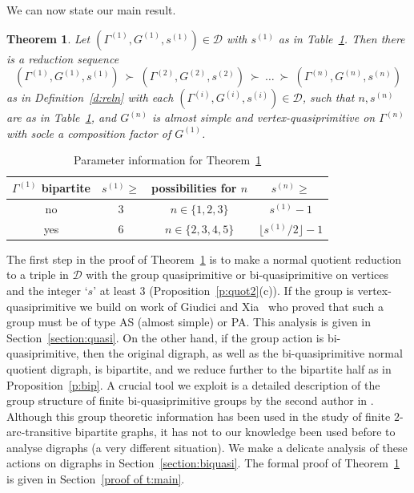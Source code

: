 \documentclass[11pt]{amsart}
\newtheorem{theorem}{Theorem}[section]
\newcommand\DD{{\mathscr{D}}}
\begin{document}
We can now state our main result.


\begin{theorem}\label{t:main}
Let $(\Gamma^{(1)},G^{(1)},s^{(1)})\in\DD$ with $s^{(1)}$ as in Table~\ref{tab:main}. Then there is a reduction sequence 
\[
(\Gamma^{(1)},G^{(1)},s^{(1)}) \ \succ\   (\Gamma^{(2)},G^{(2)},s^{(2)}) \ \succ\  \dots  \ \succ\  (\Gamma^{(n)},G^{(n)},s^{(n)})
\]
as in Definition~\ref{d:reln} with each $(\Gamma^{(i)},G^{(i)},s^{(i)})\in\DD$, such that $n, s^{(n)}$ are as in Table~\ref{tab:main}, and  $G^{(n)}$ is almost simple and vertex-quasiprimitive on $\Gamma^{(n)}$ with socle a composition factor of $G^{(1)}$. 
\end{theorem}

\begin{table}[]
    \centering
    \begin{tabular}{cccc}
    \hline
    $\Gamma^{(1)}$ bipartite  &$s^{(1)}\geqslant$  & possibilities for \(n\) &\(s^{(n)}\geqslant\) \\
       \hline
    no  & 3 & $n\in\{ 1, 2, 3\}$ & $s^{(1)}-1$ \\
    yes & 6 & $n\in\{2, 3,4,5\}$ & $\lfloor s^{(1)}/2\rfloor -1$ \\
    \hline
      \end{tabular}
    \caption{Parameter information for Theorem~\ref{t:main}}
    \label{tab:main}
\end{table}


The first step in the proof of Theorem~\ref{t:main} is to make a normal quotient reduction to a triple in $\DD$ with the group  quasiprimitive or bi-quasiprimitive on vertices and the integer `$s$' at least $3$ (Proposition~\ref{p:quot2}(c)). 
If the group is vertex-quasiprimitive we build on work of  Giudici and Xia~\cite{quasi} who proved that such a group must be  of type AS (almost simple) or PA. This analysis is given in Section~\ref{section:quasi}. 
On the other hand, if the group action is bi-quasiprimitive, then the original digraph, as well as the bi-quasiprimitive normal quotient digraph, is bipartite, and we reduce further to the bipartite half as in Proposition~\ref{p:bip}. A crucial tool we exploit is a detailed description of the group structure of finite bi-quasiprimitive groups by the second author in \cite{Praeger03}. Although this group theoretic information has been used in the study of finite \(2\)-arc-transitive bipartite graphs, it has not to our knowledge been used before to analyse digraphs (a very different situation). We make a delicate analysis of these actions on digraphs in Section~\ref{section:biquasi}. The formal proof of Theorem~\ref{t:main} is given in Section~\ref{proof of t:main}.
\end{document}
